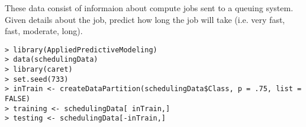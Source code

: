 


These data consist of informaion about compute jobs sent to a queuing system.
Given details about the job, predict how long the job will take (i.e. very
fast, fast, moderate, long).
\begin{framed}
\begin{verbatim}
> library(AppliedPredictiveModeling)
> data(schedulingData)
> library(caret)
> set.seed(733)
> inTrain <- createDataPartition(schedulingData$Class, p = .75, list = FALSE)
> training <- schedulingData[ inTrain,]
> testing <- schedulingData[-inTrain,]
\end{verbatim}
\end{framed}


